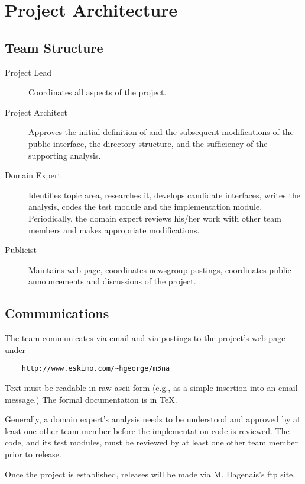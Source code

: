 \section{Project Architecture}
\subsection{Team Structure}
\begin{description}
\item[Project Lead]
     Coordinates all aspects of the project.
     
\item[Project Architect]
     Approves the initial definition of and the subsequent
     modifications of the public interface, the directory
     structure, and the sufficiency of the supporting
     analysis.
     
\item[Domain Expert]
     Identifies topic area, researches it, develops
     candidate interfaces, writes the analysis, codes the
     test module and the implementation module.
     Periodically, the domain expert reviews his/her work
     with other team members and makes appropriate
     modifications.
     
\item[Publicist]
     Maintains web page, coordinates newsgroup postings,
     coordinates public announcements and discussions of the
     project.
\end{description}

\subsection{Communications}
The team communicates via email and via postings to the
project's web page under
\begin{verbatim}
    http://www.eskimo.com/~hgeorge/m3na
\end{verbatim}

Text must be readable in raw ascii form (e.g., as a simple
insertion into an email message.) The formal documentation is in \TeX.

Generally, a domain expert's analysis needs to be understood
and approved by at least one other team member before the
implementation code is reviewed.  The code, and its test
modules, must be reviewed by at least one other team member
prior to release.

Once the project is established, releases will be made via
M. Dagenais's ftp site.

